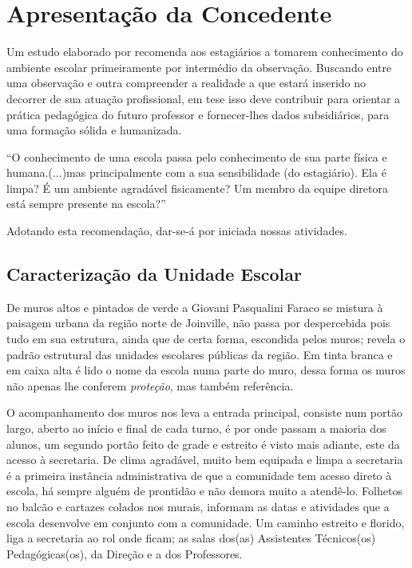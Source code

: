 \chapter{Apresentação da Concedente}
\label{cap: aprConcedente}

Um estudo elaborado por \cite{CARVALHO:2012} recomenda aos estagiários a tomarem conhecimento do ambiente escolar primeiramente por intermédio da observação. Buscando entre uma observação e outra compreender a realidade a que estará inserido no decorrer de sua atuação profissional, em tese isso deve contribuir para orientar a prática pedagógica do futuro professor e fornecer-lhes dados subsidiários, para uma formação sólida e humanizada.

\begin{citacao}
``O conhecimento de uma escola passa pelo conhecimento de sua parte física e humana.(...)mas principalmente com a sua sensibilidade (do estagiário). Ela é limpa? É um ambiente agradável fisicamente? Um membro da equipe diretora está sempre presente na escola?'' 
\end{citacao}
Adotando esta recomendação, dar-se-á por iniciada nossas atividades.

\section{Caracterização da Unidade Escolar}
De muros altos e pintados de verde a Giovani Pasqualini Faraco se mistura à paisagem urbana da região norte de Joinville, não passa por despercebida pois tudo em sua estrutura, ainda que de certa forma, escondida pelos muros; revela o padrão estrutural das unidades escolares públicas da região. Em tinta branca e em caixa alta é lido o nome da escola numa parte do muro, dessa forma os muros não apenas lhe conferem \emph{proteção}, mas também referência.

O acompanhamento dos muros nos leva a entrada principal, consiste num portão largo, aberto ao início e final de cada turno, é por onde passam a maioria dos alunos, um segundo portão feito de grade e estreito é visto mais adiante, este da acesso à secretaria. De clima agradável, muito bem equipada e limpa a secretaria é a primeira instância administrativa de que a comunidade tem acesso direto à escola, há sempre alguém de prontidão e não demora muito a atendê-lo. Folhetos no balcão e cartazes colados nos murais, informam as datas e atividades que a escola desenvolve em conjunto com a comunidade. Um caminho estreito e florido, liga a secretaria ao rol onde ficam; as salas dos(as) Assistentes Técnicos(os) Pedagógicas(os), da Direção e a dos Professores.

